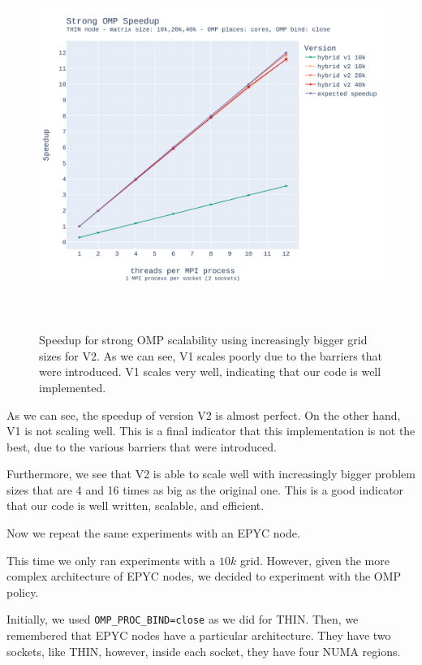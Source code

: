 \documentclass{report}
\begin{document}
\begin{figure}[H]
\centering
\includegraphics[width=14cm, height=12cm]{./images/strong_OMP_thin_hybrid_speedup.pdf}
\caption{\label{fig:strongompspeedupthin} Speedup for strong OMP scalability using 
increasingly bigger grid sizes for V2. As we can see, V1 scales poorly due to the 
barriers that were introduced. V1 scales very well, indicating that our code 
is well implemented.}
\end{figure}

As we can see, the speedup of version V2 is almost perfect. On the other hand, 
V1 is not scaling well. This is a final indicator that this implementation is not 
the best, due to the various barriers that were introduced. 

Furthermore, we see that V2 is able to scale well with increasingly bigger 
problem sizes that are 4 and 16 times as big as the original one. 
This is a good indicator that our code is well written, scalable, and efficient.   

Now we repeat the same experiments with an EPYC node.

This time we only ran experiments with a $10k$ grid. However, given the more 
complex architecture of EPYC nodes, we decided to experiment with the OMP policy.

Initially, we used \texttt{OMP\_PROC\_BIND=close} as we did for THIN. Then, we 
remembered that EPYC nodes have a particular architecture. They have two 
sockets, like THIN, however, inside each socket, they have four NUMA regions. 
\end{document}
